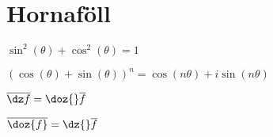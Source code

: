 \noindent
\section*{Hornaföll}


\begin{minipage}{.5\linewidth}
  $\sin^2(\theta) + \cos^2(\theta) =1$
\end{minipage}%
\begin{minipage}{.5\linewidth}
	$(\cos(\theta)+\sin(\theta))^n = \cos(n\theta)+i\sin(n\theta)$
\end{minipage}

\begin{minipage}{.5\linewidth}
	$\overline {\dz f} = \doz{} \overline{f}$
\end{minipage}%
\begin{minipage}{.5\linewidth}
	$\overline {\doz {f}} = \dz{} \overline{f}$
\end{minipage}
